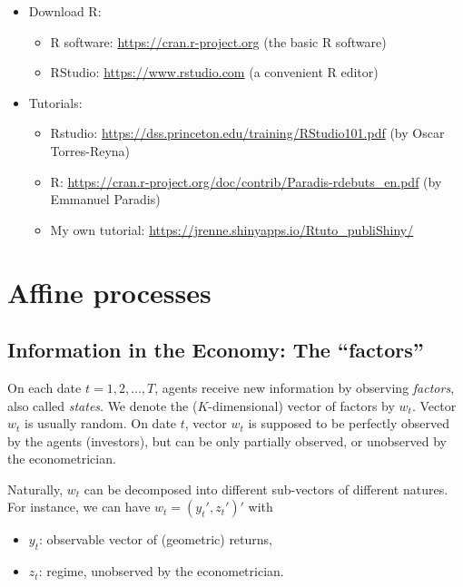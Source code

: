\documentclass[
  12pt,
]{book}
\providecommand{\tightlist}{%
  \setlength{\itemsep}{0pt}\setlength{\parskip}{0pt}}
\theoremstyle{definition}
\theoremstyle{definition}
\theoremstyle{definition}
\theoremstyle{definition}
\theoremstyle{remark}
\begin{document}
\begin{itemize}
\item
  Download R:

  \begin{itemize}
  \tightlist
  \item
    R software: \url{https://cran.r-project.org} (the basic R software)
  \item
    RStudio: \url{https://www.rstudio.com} (a convenient R editor)
  \end{itemize}
\item
  Tutorials:

  \begin{itemize}
  \tightlist
  \item
    Rstudio: \url{https://dss.princeton.edu/training/RStudio101.pdf} (by Oscar Torres-Reyna)
  \item
    R: \url{https://cran.r-project.org/doc/contrib/Paradis-rdebuts_en.pdf} (by Emmanuel Paradis)
  \item
    My own tutorial: \url{https://jrenne.shinyapps.io/Rtuto_publiShiny/}
  \end{itemize}
\end{itemize}

\hypertarget{ChapterAffine}{%
\chapter{Affine processes}\label{ChapterAffine}}

\hypertarget{Information}{%
\section{Information in the Economy: The ``factors''}\label{Information}}

On each date \(t=1,2,\dots,T\), agents receive new information by observing \emph{factors}, also called \emph{states}. We denote the (\(K\)-dimensional) vector of factors by \(w_t\). Vector \(w_t\) is usually random. On date \(t\), vector \(w_t\) is supposed to be perfectly observed by the agents (investors), but can be only partially observed, or unobserved by the econometrician.

Naturally, \(w_t\) can be decomposed into different sub-vectors of different natures. For instance, we can have \(w_t = (y_t', z_t')'\) with

\begin{itemize}
\tightlist
\item
  \(y_t\): observable vector of (geometric) returns,
\item
  \(z_t\): regime, unobserved by the econometrician.
\end{itemize}
\end{document}
